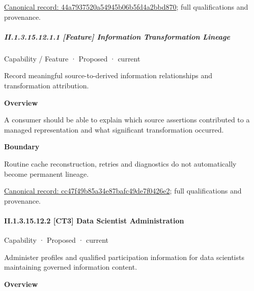 {\footnotesize \href{../../../../continuum/strategy/capability/44a7937520a54945b06b5fd4a2bbd870.md}{Canonical record: 44a7937520a54945b06b5fd4a2bbd870}; full qualifications and provenance.}\par
\subparagraph*{II.1.3.15.12.1.1 [Feature] Information Transformation Lineage}
\label{navigation:II.1.3.15.12.1.1}

\label{element:cc47f49b85a34e87bafc49de7f0426e2}
{\small Capability / Feature · Proposed · current}\par

Record meaningful source-to-derived information relationships and transformation attribution.



\textbf{Overview}



A consumer should be able to explain which source assertions contributed to a managed representation and what significant transformation occurred.



\textbf{Boundary}



Routine cache reconstruction, retries and diagnostics do not automatically become permanent lineage.


{\footnotesize \href{../../../../continuum/strategy/capability/feature/cc47f49b85a34e87bafc49de7f0426e2.md}{Canonical record: cc47f49b85a34e87bafc49de7f0426e2}; full qualifications and provenance.}\par
\paragraph*{II.1.3.15.12.2 [CT3] Data Scientist Administration}
\label{navigation:II.1.3.15.12.2}

\label{element:3bb1a11fba234717bf40c9e6452f401a}
{\small Capability · Proposed · current}\par

Administer profiles and qualified participation information for data scientists maintaining governed information content.



\textbf{Overview}



